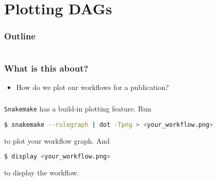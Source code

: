 \section{Plotting DAGs}

\begin{frame}
    \frametitle{Outline}
    \begin{columns}[t]
        \begin{column}{.5\textwidth}
            \tableofcontents[sections={1-9},currentsection]
        \end{column}
        \begin{column}{.5\textwidth}
            \tableofcontents[sections={10-18},currentsection]
        \end{column}
    \end{columns}
\end{frame}

\begin{frame}
  \frametitle{What is this about?}
   \begin{question}[Questions]
   	 \begin{itemize}
       \item How do we plot our workflows for a publication?
     \end{itemize}
   \end{question}
\end{frame}


\begin{frame}[fragile]
  \frametitle{}
  \texttt{Snakemake} has a build-in plotting feature. Run 
  \begin{lstlisting}[language=Bash, style=Shell]
$ snakemake --rulegraph | dot -Tpng > <your_workflow.png>
  \end{lstlisting}
  to plot your workflow graph. And
  \begin{lstlisting}[language=Bash, style=Shell]
$ display <your_workflow.png>
  \end{lstlisting}
  to display the workflow.
\end{frame}

